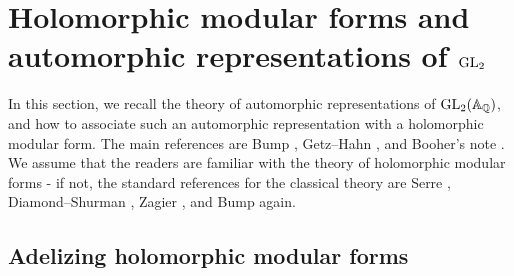 \section{Holomorphic modular forms and automorphic representations of $\mathrm{GL}_2$}
\label{sec:gl2}

In this section, we recall the theory of automorphic representations of $\mathrm{GL}_2(\mathbb{A}_{\mathbb{Q}})$, and how to associate such an automorphic representation with a holomorphic modular form.
The main references are Bump \cite{bump1998automorphic}, Getz--Hahn \cite{getz2023introduction}, and Booher's note \cite{booher}.
We assume that the readers are familiar with the theory of holomorphic modular forms - if not, the standard references for the classical theory are Serre \cite{serre2012course}, Diamond--Shurman \cite{diamond2005first}, Zagier \cite{zagier2008elliptic}, and Bump \cite[Chapter 1]{bump1998automorphic} again.

\subsection{Adelizing holomorphic modular forms}
\label{subsec:gl2auto}

